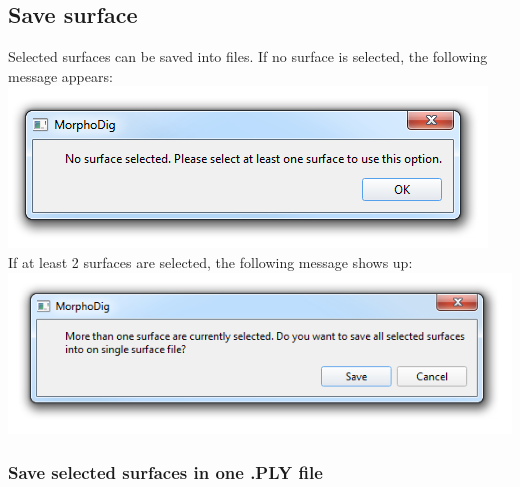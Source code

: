 \subsection{Save surface}
Selected surfaces can be saved into files. If no surface is selected, the following message appears:\\
\includegraphics[scale=0.5]{images/07/surface/no_surface_selected.png}\\
If at least 2 surfaces are selected, the following message shows up:\\
\includegraphics[scale=0.5]{images/07/surface/at_least_2_surfaces_selected.png}

\subsubsection{Save selected surfaces in one .PLY file}

